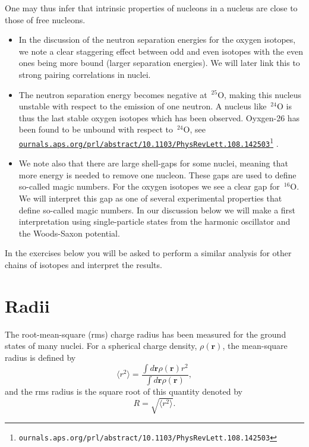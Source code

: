 \documentclass[graybox,sectrefs,envcountresetchap,open=right]{svmonodo}
\begin{document}
\noindent
One may thus infer that intrinsic properties of nucleons in a nucleus are close to those of free nucleons.
\begin{itemize}
\item In the discussion of the neutron separation energies for the oxygen isotopes, we note  a clear staggering effect between odd and even isotopes with the even ones being more bound (larger separation energies). We will later link this to strong pairing correlations in nuclei.

\item The neutron separation energy becomes negative at $\,{}^{25}\mbox{O}$, making this nucleus unstable with respect to the emission of one neutron. A nucleus like $\,{}^{24}\mbox{O}$ is thus the last stable oxygen isotopes which has been observed. Oyxgen-26 has been found to be unbound with respect to $\,{}^{24}\mbox{O}$, see \href{{ournals.aps.org/prl/abstract/10.1103/PhysRevLett.108.142503}}{\nolinkurl{ournals.aps.org/prl/abstract/10.1103/PhysRevLett.108.142503}\footnote{\texttt{ournals.aps.org/prl/abstract/10.1103/PhysRevLett.108.142503}}} .

\item We note also that there are large shell-gaps for some nuclei, meaning that more energy is needed to remove one nucleon. These gaps are used to define so-called magic numbers. For the oxygen isotopes we see a clear gap for $\,{}^{16}\mbox{O}$. We will interpret this gap as one of several experimental properties that define so-called magic numbers. In our discussion below we will make a first interpretation using  single-particle states from the harmonic oscillator and the Woods-Saxon potential. 
\end{itemize}

\noindent
In the exercises below you will be asked to perform a similar analysis for other chains of isotopes and interpret the results. 



\section{Radii}

The root-mean-square (rms) charge radius has been measured for the ground states of many
nuclei. For a spherical charge density, $\rho(\bm{r})$, the mean-square radius is defined by
\[
\langle r^2\rangle = \frac{ \int  d \bm{r} \rho(\bm{r}) r^2}{ \int  d \bm{r} \rho(\bm{r})},
\]
and the rms radius is the square root of this quantity denoted by
\[
R =\sqrt{ \langle r^2\rangle}.
\]
\end{document}
